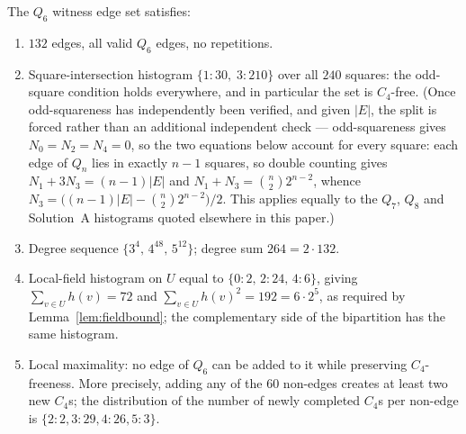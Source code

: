 \documentclass[12pt]{article}
\begin{document}
\begin{proposition}\label{prop:q6oddsquare}
The $Q_6$ witness edge set satisfies:
\begin{enumerate}[label=(\roman*)]
  \item $132$ edges, all valid $Q_6$ edges, no repetitions.
  \item Square-intersection histogram $\{1\!:\!30,\;3\!:\!210\}$ over all
    $240$ squares: the odd-square condition holds everywhere, and in
    particular the set is $C_4$-free. (Once odd-squareness has independently
    been verified, and given $|E|$, the split is forced rather than an
    additional independent check --- odd-squareness gives
    $N_0=N_2=N_4=0$, so the two equations below account for every
    square: each edge of $Q_n$ lies in
    exactly $n-1$ squares, so double counting gives
    $N_1+3N_3=(n-1)|E|$ and $N_1+N_3=\binom{n}{2}2^{n-2}$, whence
    $N_3=\bigl((n-1)|E|-\binom{n}{2}2^{n-2}\bigr)/2$. This applies equally to
    the $Q_7$, $Q_8$ and Solution~A histograms quoted elsewhere in this paper.)
  \item Degree sequence $\{3^4,\,4^{48},\,5^{12}\}$; degree sum
    $264=2\cdot132$.
  \item Local-field histogram on $U$ equal to
    $\{0\!:\!2,\,2\!:\!24,\,4\!:\!6\}$, giving
    $\sum_{v\in U}h(v)=72$ and $\sum_{v\in U}h(v)^2=192=6\cdot2^5$,
    as required by Lemma~\ref{lem:fieldbound}; the complementary side
    of the bipartition has the same histogram.
  \item Local maximality: no edge of $Q_6$ can be added to it while
    preserving $C_4$-freeness. More precisely, adding any of the $60$
    non-edges creates at least two new $C_4$s; the distribution of the number
    of newly completed $C_4$s per non-edge is
    $\{2{:}2,3{:}29,4{:}26,5{:}3\}$.
\end{enumerate}
\end{proposition}
\end{document}
